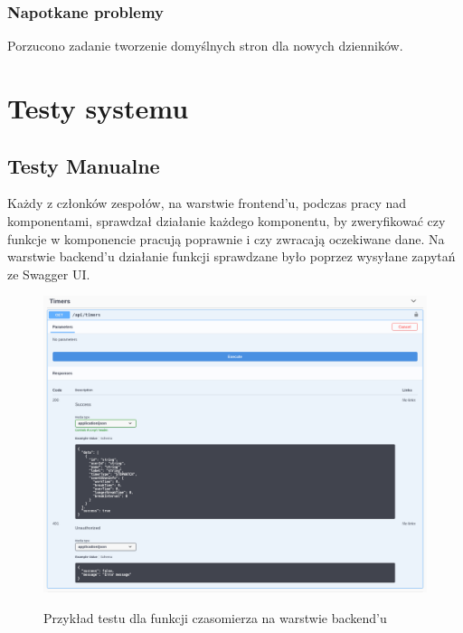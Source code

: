 \documentclass[a4paper,11pt]{report}
\begin{document}
\subsection {Napotkane problemy}
Porzucono zadanie tworzenie domyślnych stron dla nowych dzienników.\\

\chapter {Testy systemu}
\section{Testy Manualne}
Każdy z członków zespołów, na warstwie frontend'u, podczas pracy nad komponentami, sprawdzał działanie każdego komponentu,
 by zweryfikować czy funkcje w komponencie pracują poprawnie i czy zwracają oczekiwane dane.
Na warstwie backend'u działanie funkcji sprawdzane było poprzez wysyłane zapytań ze Swagger UI.
\begin{figure}[H]
	\centering
	\includegraphics[scale=0.35]{testy/timer_postman}\\
	\caption{Przykład testu dla funkcji czasomierza na warstwie backend'u}
	\label{fig:timer_postman}
\end{figure}
\end{document}

